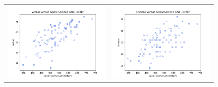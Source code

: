 \begin{enumerate}[label= (\alph*)]
\begin{figure}[H]
\begin{tabular}{cc}
        \end{tabular}
    \end{figure}

    \begin{figure}[H]
        \centering
        \begin{tabular}{cc}
            \includegraphics[scale=0.35]{./python/chapter-5/Question-5-18-c-xy-SocSciHist-Verbal.png} &
            \includegraphics[scale=0.35]{./python/chapter-5/Question-5-18-c-xy-SocSciHist-Science.png} \\

\end{tabular}
\end{figure}
\end{enumerate}
